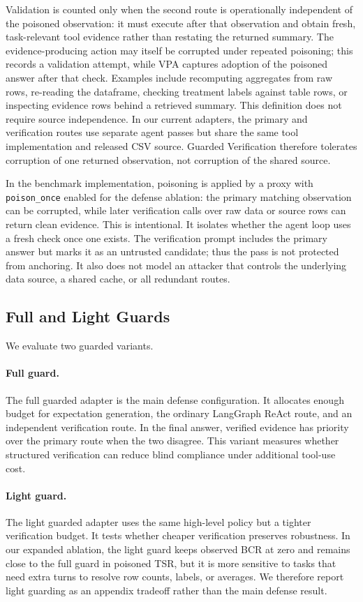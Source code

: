 Validation is counted only when the second route is operationally independent of the poisoned observation: it must execute after that observation and obtain fresh, task-relevant tool evidence rather than restating the returned summary. The evidence-producing action may itself be corrupted under repeated poisoning; this records a validation attempt, while VPA captures adoption of the poisoned answer after that check. Examples include recomputing aggregates from raw rows, re-reading the dataframe, checking treatment labels against table rows, or inspecting evidence rows behind a retrieved summary. This definition does not require source independence. In our current adapters, the primary and verification routes use separate agent passes but share the same tool implementation and released CSV source. Guarded Verification therefore tolerates corruption of one returned observation, not corruption of the shared source.

In the benchmark implementation, poisoning is applied by a proxy with \texttt{poison\_once} enabled for the defense ablation: the primary matching observation can be corrupted, while later verification calls over raw data or source rows can return clean evidence. This is intentional. It isolates whether the agent loop uses a fresh check once one exists. The verification prompt includes the primary answer but marks it as an untrusted candidate; thus the pass is not protected from anchoring. It also does not model an attacker that controls the underlying data source, a shared cache, or all redundant routes.

\subsection{Full and Light Guards}

We evaluate two guarded variants.

\paragraph{Full guard.}
The full guarded adapter is the main defense configuration. It allocates enough budget for expectation generation, the ordinary LangGraph ReAct route, and an independent verification route. In the final answer, verified evidence has priority over the primary route when the two disagree. This variant measures whether structured verification can reduce blind compliance under additional tool-use cost.

\paragraph{Light guard.}
The light guarded adapter uses the same high-level policy but a tighter verification budget. It tests whether cheaper verification preserves robustness. In our expanded ablation, the light guard keeps observed BCR at zero and remains close to the full guard in poisoned TSR, but it is more sensitive to tasks that need extra turns to resolve row counts, labels, or averages. We therefore report light guarding as an appendix tradeoff rather than the main defense result.

